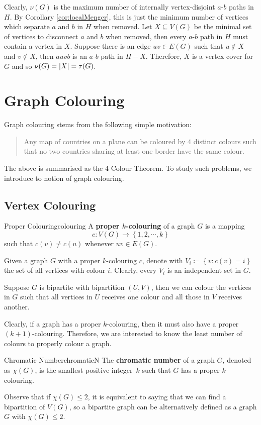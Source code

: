 \documentclass[math]{amznotes}
\theoremstyle{remark}
\begin{document}
Clearly, $\nu(G)$ is the maximum number of internally vertex-disjoint $a$-$b$ paths in $H$. By Corollary \ref{cor:localMenger}, this is just the minimum number of vertices which separate $a$ and $b$ in $H$ when removed. Let $X \subseteq V(G)$ be the minimal set of vertices to disconnect $a$ and $b$ when removed, then every $a$-$b$ path in $H$ must contain a vertex in $X$. Suppose there is an edge $uv \in E(G)$ such that $u \notin X$ and $v \notin X$, then $auvb$ is an $a$-$b$ path in $H - X$. Therefore, $X$ is a vertex cover for $G$ and so $\nu(G) = {\left\lvert {X} \right\rvert} = \tau(G)$.
\chapter{Graph Colouring}
Graph colouring stems from the following simple motivation:
\begin{quote}
    Any map of countries on a plane can be coloured by $4$ distinct colours such that no two countries sharing at least one border have the same colour.
\end{quote}
The above is summarised as the $4$ Colour Theorem. To study such problems, we introduce to notion of graph colouring.
\section{Vertex Colouring}
\begin{dfnbox}{Proper Colouring}{colouring}
    A {\color{red} \textbf{proper $k$-colouring}} of a graph $G$ is a mapping 
    \begin{equation*}
        c \colon V(G) \to \left\{1, 2, \cdots, k\right\}
    \end{equation*}
    such that $c(v) \neq c(u)$ whenever $uv \in E(G)$.
\end{dfnbox}
Given a graph $G$ with a proper $k$-colouring $c$, denote with $V_i \coloneqq \left\{v \colon c(v) = i\right\}$ the set of all vertices with colour $i$. Clearly, every $V_i$ is an independent set in $G$.

Suppose $G$ is bipartite with bipartition $(U, V)$, then we can colour the vertices in $G$ such that all vertices in $U$ receives one colour and all those in $V$ receives another.

Clearly, if a graph has a proper $k$-colouring, then it must also have a proper $(k + 1)$-colouring. Therefore, we are interested to know the least number of colours to properly colour a graph.
\begin{dfnbox}{Chromatic Number}{chromaticN}
    The {\color{red} \textbf{chromatic number}} of a graph $G$, denoted as $\chi(G)$, is the smallest positive integer~$k$ such that $G$ has a proper $k$-colouring.
\end{dfnbox}
Observe that if $\chi(G) \leq 2$, it is equivalent to saying that we can find a bipartition of $V(G)$, so a bipartite graph can be alternatively defined as a graph $G$ with $\chi(G) \leq 2$. 
\end{document}
